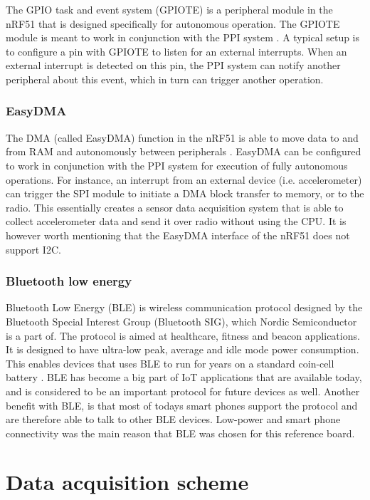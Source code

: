 The GPIO task and event system (GPIOTE) is a peripheral module in the nRF51 that is designed specifically for autonomous operation. The GPIOTE module is meant to work in conjunction with the PPI system \cite[~p.35]{nrf51}. A typical setup is to configure a pin with GPIOTE to listen for an external interrupts. When an external interrupt is detected on this pin, the PPI system can notify another peripheral about this event, which in turn can trigger another operation.

\subsubsection{EasyDMA}

The DMA (called EasyDMA) function in the nRF51 is able to move data to and from RAM and autonomously between peripherals \cite[~p.34]{nrf51}. EasyDMA can be configured to work in conjunction with the PPI system for execution of fully autonomous operations. For instance, an interrupt from an external device (i.e. accelerometer) can trigger the SPI module to initiate a DMA block transfer to memory, or to the radio. This essentially creates a sensor data acquisition system that is able to collect accelerometer data and send it over radio without using the CPU. It is however worth mentioning that the EasyDMA interface of the nRF51 does not support I2C.

\subsubsection{Bluetooth low energy}

Bluetooth Low Energy (BLE) is wireless communication protocol designed by the Bluetooth Special Interest Group (Bluetooth SIG), which Nordic Semiconductor is a part of. The protocol is aimed at healthcare, fitness and beacon applications. It is designed to have ultra-low peak, average and idle mode power consumption. This enables devices that uses BLE to run for years on a standard coin-cell battery \cite{ble}. BLE has become a big part of IoT applications that are available today, and is considered to be an important protocol for future devices as well. Another benefit with BLE, is that most of todays smart phones support the protocol and are therefore able to talk to other BLE devices. Low-power and smart phone connectivity was the main reason that BLE was chosen for this reference board. 

\section{Data acquisition scheme}

